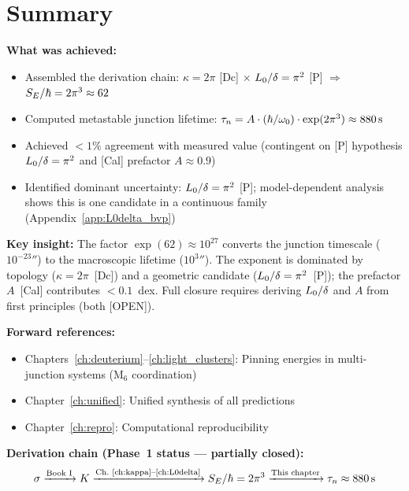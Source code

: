 \section{Summary}
\label{sec:taun:summary}

\begin{resultbox}
    \textbf{What was achieved:}
    \begin{itemize}
        \item Assembled the derivation chain:
              $\kappa = 2\pi$ [Dc] $\times$ $L_0/\delta = \pi^2$ [P]
              $\Rightarrow$ $S_E/\hbar = 2\pi^3 \approx 62$
        \item Computed metastable junction lifetime:
              $\tau_n = A \cdot (\hbar/\omega_0) \cdot \exp(2\pi^3) \approx 880\,\mathrm{s}$
        \item Achieved $< 1\%$ agreement with measured value
              (contingent on [P] hypothesis $L_0/\delta = \pi^2$
              and [Cal] prefactor $A \approx 0.9$)
        \item Identified dominant uncertainty: $L_0/\delta = \pi^2$ [P];
              model-dependent analysis shows this is one candidate in a
              continuous family (Appendix~\ref{app:L0delta_bvp})
    \end{itemize}

    \textbf{Key insight:} The factor $\exp(62) \approx 10^{27}$ converts the
    junction timescale ($10^{-23}\second$) to the macroscopic lifetime
    ($10^{3}\second$). The exponent is dominated by topology ($\kappa = 2\pi$~[Dc])
    and a geometric candidate ($L_0/\delta = \pi^2$~[P]); the prefactor
    $A$~[Cal] contributes $< 0.1$~dex. Full closure requires deriving
    $L_0/\delta$ and $A$ from first principles (both [OPEN]).
\end{resultbox}

\bigskip
\noindent
\textbf{Forward references:}
\begin{itemize}
    \item Chapters~\ref{ch:deuterium}--\ref{ch:light_clusters}: Pinning energies
          in multi-junction systems (M$_6$ coordination)
    \item Chapter~\ref{ch:unified}: Unified synthesis of all predictions
    \item Chapter~\ref{ch:repro}: Computational reproducibility
\end{itemize}

\bigskip
\noindent
\textbf{Derivation chain (Phase~1 status --- partially closed):}
\begin{equation*}
    \sigma \xrightarrow{\text{Book I}} K
    \xrightarrow{\text{Ch.~\ref{ch:kappa}--\ref{ch:L0delta}}} S_E/\hbar = 2\pi^3
    \xrightarrow{\text{This chapter}} \tau_n \approx 880\,\mathrm{s}
\end{equation*}

